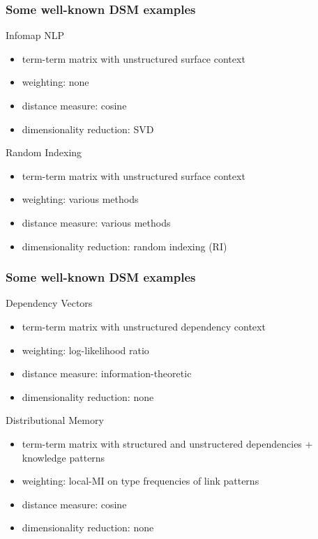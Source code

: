 \documentclass[t]{beamer} %
\begin{document}
\begin{frame}
  \frametitle{Some well-known DSM examples}

  \ungap
  \begin{block} {Infomap NLP \citep{Widdows:04}}
  \begin{itemize}
  \item term-term matrix with unstructured surface context
  \item weighting: none
  \item distance measure: cosine
  \item dimensionality reduction: SVD
  \end{itemize}
  \end{block}
 
  \begin{block} {Random Indexing \citep{Karlgren:Sahlgren:01}}
    \begin{itemize}
    \item term-term matrix with unstructured surface context
    \item weighting: various methods 
    \item distance measure: various methods
    \item dimensionality reduction: random indexing (RI)
    \end{itemize}
  \end{block}
\end{frame}

\begin{frame}
  \frametitle{Some well-known DSM examples}

  \ungap
  \begin{block}{Dependency Vectors \citep{Pado:Lapata:07}}
  \begin{itemize}
  \item term-term matrix with unstructured dependency context
  \item weighting: log-likelihood ratio
  \item distance measure: information-theoretic \citep{Lin:98a}
  \item dimensionality reduction: none
  \end{itemize}
  \end{block}
 
 \begin{block} {Distributional Memory \citep{Baroni:Lenci:10}}
  \begin{itemize}
  \item term-term matrix with structured and unstructered dependencies + knowledge patterns
  \item weighting: local-MI on type frequencies of link patterns
  \item distance measure: cosine
  \item dimensionality reduction: none
  \end{itemize}
  \end{block}
 \end{frame}
\end{document}
